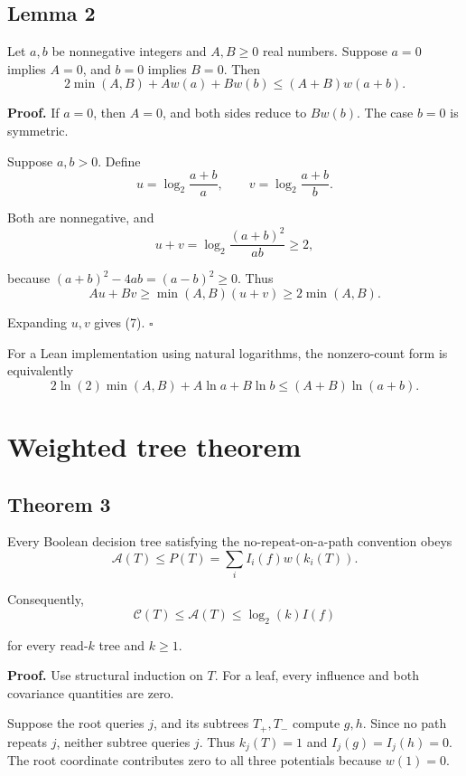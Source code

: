 \documentclass[
  american,
  11pt,
]{article}
\begin{document}
\subsection*{Lemma 2}\label{lemma-2}

Let \(a,b\) be nonnegative integers and \(A,B\geq0\) real numbers.
Suppose \(a=0\) implies \(A=0\), and \(b=0\) implies \(B=0\). Then \[
2\min(A,B)+A w(a)+B w(b)
\leq(A+B)w(a+b).
\tag{7}
\]

\textbf{Proof.} If \(a=0\), then \(A=0\), and both sides reduce to
\(B w(b)\). The case \(b=0\) is symmetric.

Suppose \(a,b>0\). Define \[
u=\log_2\frac{a+b}{a},\qquad
v=\log_2\frac{a+b}{b}.
\]

Both are nonnegative, and \[
u+v=\log_2\frac{(a+b)^2}{ab}\geq2,
\]

because \((a+b)^2-4ab=(a-b)^2\geq0\). Thus \[
Au+Bv\geq\min(A,B)(u+v)\geq2\min(A,B).
\]

Expanding \(u,v\) gives (7). \(\square\)

For a Lean implementation using natural logarithms, the nonzero-count
form is equivalently \[
2\ln(2)\min(A,B)+A\ln a+B\ln b
\leq(A+B)\ln(a+b).
\]

\section{Weighted tree theorem}\label{weighted-tree-theorem}

\subsection*{Theorem 3}\label{theorem-3}

Every Boolean decision tree satisfying the no-repeat-on-a-path
convention obeys \[
\mathcal A(T)\leq P(T)=\sum_i I_i(f)w(k_i(T)).
\tag{8}
\]

Consequently, \[
\mathcal C(T)\leq\mathcal A(T)\leq\log_2(k)I(f)
\tag{9}
\]

for every read-\(k\) tree and \(k\geq1\).

\textbf{Proof.} Use structural induction on \(T\). For a leaf, every
influence and both covariance quantities are zero.

Suppose the root queries \(j\), and its subtrees \(T_+,T_-\) compute
\(g,h\). Since no path repeats \(j\), neither subtree queries \(j\).
Thus \(k_j(T)=1\) and \(I_j(g)=I_j(h)=0\). The root coordinate
contributes zero to all three potentials because \(w(1)=0\).
\end{document}
